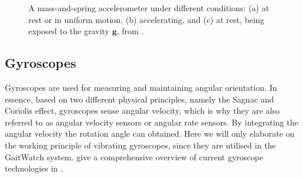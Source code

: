\begin{figure}
\centering
{}
\caption{A mass-and-spring accelerometer under different conditions: (a) at rest or in uniform motion, (b) accelerating, and (c) at rest, being exposed to the gravity $\mathbf{g}$, from \cite{bhattacharyya_inertial_sensors_applications_13}.}
	\label{fig:accelerometer}
\end{figure}


\subsection{Gyroscopes}

Gyroscopes are used for measuring and maintaining angular orientation. In essence, based on two different physical principles, namely the Sagnac and Coriolis effect, gyroscopes sense angular velocity, which is why they are also referred to as angular velocity sensors or angular rate sensors. By integrating the angular velocity the rotation angle can obtained. Here we will only elaborate on the working principle of vibrating gyroscopes, since they are utilised in the GaitWatch system. \citeauthor{armenise2010advances} give a comprehensive overview of current gyroscope technologies in \cite{armenise2010advances}.

